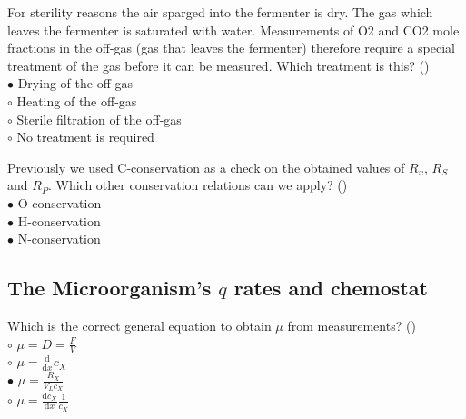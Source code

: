 \documentclass[]{beamer}
\begin{document}
\begin{frame}[shrink] {}
\addtocounter{questions}{1}
\color{blue} For sterility reasons the air sparged into the fermenter is dry. The gas which leaves the fermenter is saturated with water. Measurements of O2 and CO2 mole fractions in the off-gas (gas that leaves the fermenter) therefore require a special treatment of the gas before it can be measured. Which treatment is this?  ()\\
\color{black}
\setlength{\parindent}{-0.4cm}
{\color{red}$\bullet$}     Drying of the off-gas \\
{\color{red}$\circ$} Heating of the off-gas \\
{\color{red}$\circ$} Sterile filtration of the off-gas\\
{\color{red}$\circ$} No treatment is required  
\end{frame}

\begin{frame}[shrink] {}
\addtocounter{questions}{1}
\color{blue}
Previously we used C-conservation as a check on the obtained values of $R_x$, $R_S$ and $R_P$.  Which other conservation relations can we apply?  ()\\
\color{black}
\setlength{\parindent}{-0.4cm}
{\color{red}$\bullet$}     O-conservation \\
{\color{red}$\bullet$} H-conservation\\
{\color{red}$\bullet$} N-conservation  \\
\end{frame}
\subsection{The Microorganism's $q$ rates and chemostat} 
\setcounter{questions}{0}

\begin{frame}[shrink] {}
\addtocounter{questions}{1}
\color{blue}
 Which is the correct general equation to obtain $\mu$ from measurements? ()\\
\color{black}
\setlength{\parindent}{-0.4cm}
{\color{red}$\circ$} $\mu= D = \frac{F}{V}$ \\ 
{\color{red}$\circ$} $\mu = \frac{\mathrm d}{\mathrm d x}c_X$\\
{\color{red}$\bullet$} $\mu = \frac{R_X}{V_{L}c_X}$ \\
{\color{red}$\circ$} $\mu = \frac{\mathrm dc_X}{\mathrm d x} \frac{1}{c_X}$\\
\end{frame}
\end{document}
